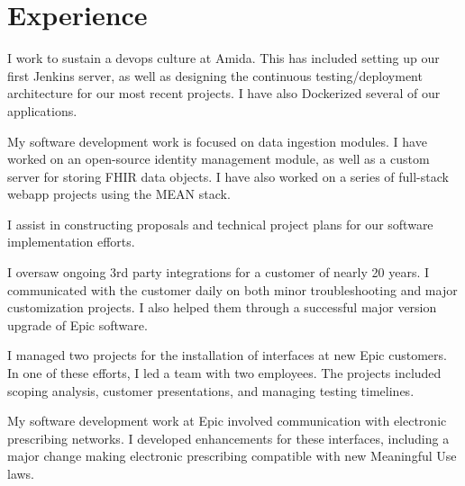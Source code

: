 \documentclass[]{deedy-resume-openfont}
\begin{document}
\hfill
\begin{minipage}[t]{0.66\textwidth}


\section{Experience}

\vspace{\topsep} %
\begin{tightemize}
\item I work to sustain a devops culture at Amida. This has included setting up our first Jenkins
server, as well as designing the continuous testing/deployment architecture for our most recent projects.
I have also Dockerized several of our applications.
\item My software development work is focused on data ingestion modules. I have worked on an open-source
identity management module, as well as a custom server for storing FHIR data objects. I have also worked on
a series of full-stack webapp projects using the MEAN stack.
\item I assist in constructing proposals and technical project plans for our software implementation efforts.
\end{tightemize}
\sectionsep

\begin{tightemize}
\item I oversaw ongoing 3rd party integrations for a customer of nearly 20 years. I communicated with
the customer daily on both minor troubleshooting and major customization projects. I also helped them through a
successful major version upgrade of Epic software.
\item  I managed two projects for the installation of interfaces at new Epic customers. In one of these efforts, I led a team
with two employees. The projects included scoping analysis, customer presentations, and managing testing timelines.
\item My software development work at Epic involved communication with electronic prescribing networks.
I developed enhancements for these interfaces, including a major change making electronic prescribing
compatible with new Meaningful Use laws.
\end{tightemize}
\sectionsep


\end{minipage}
\end{document}
